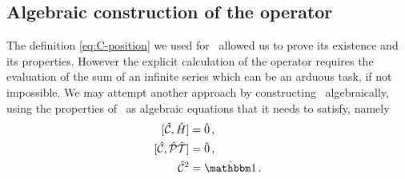         \subsection{Algebraic construction of the \texorpdfstring{\hC}{C} operator}
            The definition \eqref{eq:C-position} we used for \hC\ allowed us to prove its existence and its properties. However the explicit calculation of the operator requires the evaluation of the sum of an infinite series which can be an arduous task, if not impossible. We may attempt another approach \cite{bender2024} by constructing \hC\ algebraically, using the properties of \hC\ as algebraic equations that it needs to satisfy, namely
            \begin{align*}
                \comm*{\hC}{\hH}\! &= \hzero 
                \mycomma \\
                \comm*{\hC}{\hPT}\! &= \hzero 
                \mycomma \\
                \hC^2 &= \hidM
                \myperiod
            \end{align*}
            
